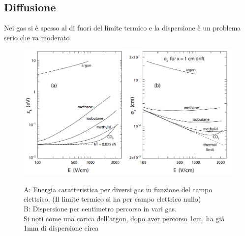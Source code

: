 \subsection*{Diffusione}
Nei gas si è spesso al di fuori del limite termico e la dispersione è un problema serio che va moderato

\hspace{-25pt}
\begin{minipage}{0.7\textwidth}
    \begin{figure}[H]
        \centering
        \includegraphics[width=\textwidth,frame]{Chapters/images/Interazione_radiazione_materia/image-20220222180147403.png}
    \end{figure}
\end{minipage}
\begin{minipage}{0.35\textwidth}
\begin{figure}[H]
    \centering
    \captionsetup{width=\textwidth}
    \caption{A: Energia caratteristica per diversi gas in funzione del campo elettrico. (Il limite termico si ha per campo elettrico nullo)
    \\ B: Dispersione per centimetro percorso in vari gas.\\ Si noti come una carica dell'argon, dopo aver percorso 1cm, ha già 1mm di dispersione circa}
\end{figure}
\end{minipage}

